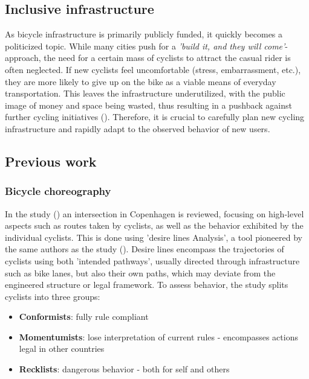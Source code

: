 \subsection{Inclusive infrastructure}
As bicycle infrastructure is primarily publicly funded, it quickly becomes a politicized topic. 
While many cities push for a \textit{'build it, and they will come'}-approach, the need for a certain mass 
of cyclists to attract the casual rider is often neglected.
If new cyclists feel uncomfortable (stress, embarrassment, etc.), they are more likely to give up on the bike as a viable means of everyday transportation. 
This leaves the infrastructure underutilized, with the public image of money and space being wasted, 
thus resulting in a pushback against further cycling initiatives (\cite{backlash}).
Therefore, it is crucial to carefully plan new cycling infrastructure and rapidly adapt to the observed behavior of new users.

\subsection{Previous work}

\subsubsection{Bicycle choreography}
In the study (\cite{copenhagenize2014}) an intersection in Copenhagen is reviewed, focusing on high-level aspects
such as routes taken by cyclists, as well as the behavior exhibited by the individual cyclists.
This is done using 'desire lines Analysis', a tool pioneered by the same authors as the study (\cite{copenhagenize_book}).
Desire lines encompass the trajectories of cyclists using both 'intended pathways', usually directed through infrastructure such as
 bike lanes, but also their own paths, which may deviate from the engineered structure or legal framework.
 To assess behavior, the study splits cyclists into three groups:

\begin{itemize}
	\item \textbf{Conformists}: fully rule compliant
	\item \textbf{Momentumists}: lose interpretation of current rules - encompasses actions legal in other countries
	\item \textbf{Recklists}: dangerous behavior - both for self and others
\end{itemize}

